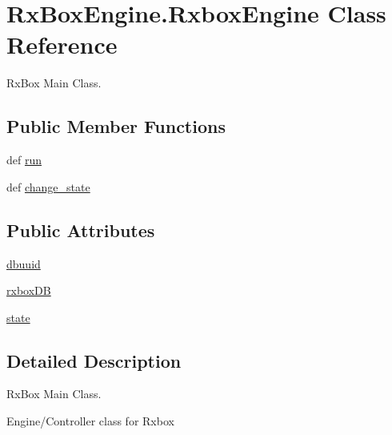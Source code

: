 \hypertarget{class_rx_box_engine_1_1_rxbox_engine}{
\section{RxBoxEngine.RxboxEngine Class Reference}
\label{class_rx_box_engine_1_1_rxbox_engine}
}


RxBox Main Class.  


\subsection*{Public Member Functions}
\begin{DoxyCompactItemize}
\item 
def \hyperlink{class_rx_box_engine_1_1_rxbox_engine_adc0fa963405ce2c724c519eb8d7a2ef0}{run}
\item 
def \hyperlink{class_rx_box_engine_1_1_rxbox_engine_a4422088b356df39a943926fb799b4cf9}{change\_\-state}
\end{DoxyCompactItemize}
\subsection*{Public Attributes}
\begin{DoxyCompactItemize}
\item 
\hyperlink{class_rx_box_engine_1_1_rxbox_engine_abeb8130b896bfb752c37640ae757100b}{dbuuid}
\item 
\hyperlink{class_rx_box_engine_1_1_rxbox_engine_ac46747cdf03cc9cbfa315647a55ffbc9}{rxboxDB}
\item 
\hyperlink{class_rx_box_engine_1_1_rxbox_engine_afc441ee0efbabc9e96cef01013226408}{state}
\end{DoxyCompactItemize}


\subsection{Detailed Description}
RxBox Main Class. 

\begin{DoxyVerb}
    Engine/Controller class for Rxbox
    \end{DoxyVerb}
 

